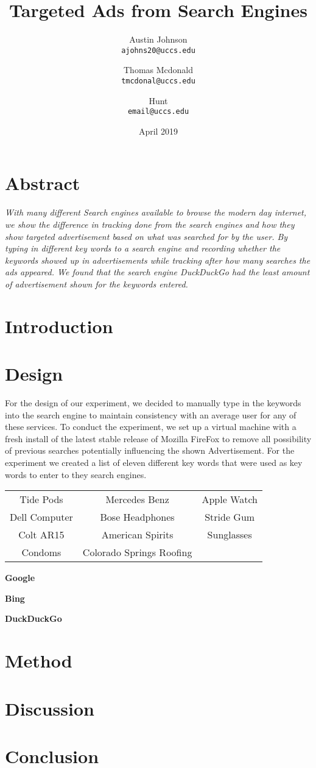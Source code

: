 \documentclass{article}
\author{Austin Johnson \\
\texttt{ajohns20@uccs.edu}
\and 
Thomas Mcdonald \\
\texttt{tmcdonal@uccs.edu}
\and 
Hunt \\
\texttt{email@uccs.edu}
}
\title{Targeted Ads from Search Engines}
\date{April 2019}
\begin{document}
\maketitle


\section{Abstract}
\small
\textit{
    With many different Search engines available to browse the modern day internet, we show the difference in tracking done from the search engines and how they show targeted advertisement based on what was searched for by the user. By typing in different key words to a search engine and recording whether the keywords showed up in advertisements while tracking after how many searches the ads appeared. We found that the search engine DuckDuckGo had the least amount of advertisement shown for the keywords entered. }    

\section{Introduction}

\section{Design}
For the design of our experiment, we decided to manually type in the keywords into the search engine to maintain consistency with an average user for any of these services. To conduct the experiment, we set up a virtual machine with a fresh install of the latest stable release of Mozilla FireFox to remove all possibility of previous searches potentially influencing the shown Advertisement. For the experiment we created a list of eleven different key words that were used as key words to enter to they search engines.

\begin{tabular}{ c c c }

\hline

 Tide Pods & Mercedes Benz & Apple Watch \\ 
 Dell Computer & Bose Headphones & Stride Gum \\  
 Colt AR15 & American Spirits & Sunglasses \\
 Condoms & Colorado Springs Roofing & \\

\hline
\end{tabular}



\textbf{Google}

\textbf{Bing}

\textbf{DuckDuckGo}

\section{Method}

\section{Discussion}


\section{Conclusion}
\end{document}
